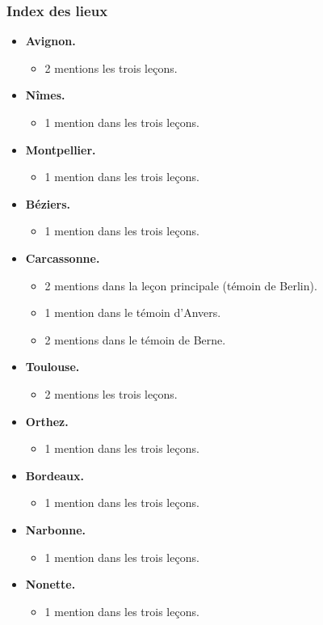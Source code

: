 \documentclass[12pt, a4paper]{article}
\begin{document}
        \subsubsection{Index des lieux}
        \begin{itemize} \item{\textbf{Avignon.}  \begin{itemize} \item{2 mentions les trois leçons.}  \end{itemize}}  \item{\textbf{Nîmes.}  \begin{itemize} \item{1 mention dans les trois leçons.}  \end{itemize}}  \item{\textbf{Montpellier.}  \begin{itemize} \item{1 mention dans les trois leçons.}  \end{itemize}}  \item{\textbf{Béziers.}  \begin{itemize} \item{1 mention dans les trois leçons.}  \end{itemize}}  \item{\textbf{Carcassonne.}  \begin{itemize} \item{2 mentions dans la leçon principale (témoin de Berlin).}  \item{1 mention dans le témoin d'Anvers.}  \item{2 mentions dans le témoin de Berne.}  \end{itemize}}  \item{\textbf{Toulouse.}  \begin{itemize} \item{2 mentions les trois leçons.}  \end{itemize}}  \item{\textbf{Orthez.}  \begin{itemize} \item{1 mention dans les trois leçons.}  \end{itemize}}  \item{\textbf{Bordeaux.}  \begin{itemize} \item{1 mention dans les trois leçons.}  \end{itemize}}  \item{\textbf{Narbonne.}  \begin{itemize} \item{1 mention dans les trois leçons.}  \end{itemize}}  \item{\textbf{Nonette.}  \begin{itemize} \item{1 mention dans les trois leçons.}  \end{itemize}} \end{itemize}
                \pagebreak
            
\end{document}
